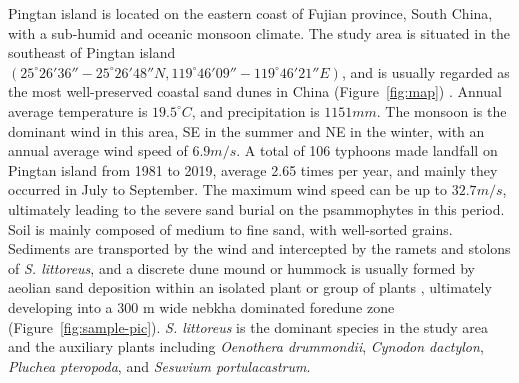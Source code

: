 \documentclass[]{interact}
\theoremstyle{plain}%
\theoremstyle{definition}
\theoremstyle{remark}
\begin{document}
Pingtan island is located on the eastern coast of Fujian province, South China, with a sub-humid and oceanic monsoon climate. The study area is situated in the southeast of Pingtan island $(25^{\circ}26'36''-25^{\circ}26'48''N, 119^{\circ}46'09''-119^{\circ}46'21''E)$, and is usually regarded as the most well-preserved coastal sand dunes in China (Figure~\ref{fig:map}) 
\citep{yangDiurnalvariationcharacteristics2017}. 
Annual average temperature is $19.5^{\circ}C$, and precipitation is $1151 mm$. The monsoon is the dominant wind in this area, SE in the summer and NE in the winter, with an annual average wind speed of $6.9 m/s$. A total of 106 typhoons made landfall on Pingtan island from 1981 to 2019, average 2.65 times per year, and mainly they occurred in July to September. The maximum wind speed can be up to $32.7 m/s$, ultimately leading to the severe sand burial on the psammophytes in this period. Soil is mainly composed of medium to fine sand, with well-sorted grains. Sediments are transported by the wind and intercepted by the ramets and stolons of \textit{S. littoreus}, and a discrete dune mound or hummock is usually formed by aeolian sand deposition within an isolated plant or group of plants \citep{hespCFDFlowDynamics2019}, ultimately developing into a 300 m wide nebkha dominated foredune zone (Figure~\ref{fig:sample-pic}). \textit{S. littoreus} is the dominant species in the study area and the auxiliary plants including \textit{Oenothera drummondii}, \textit{Cynodon dactylon}, \textit{Pluchea pteropoda}, and \textit{Sesuvium portulacastrum}. 
\end{document}
